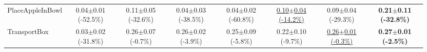\begin{table}[htbp]
\begin{adjustbox}{max width=\textwidth}
\begin{tabular}{l*{7}{c}}
PlaceAppleInBowl & 0.04$\pm$0.01 \scriptsize{(-52.5\%)} & 0.11$\pm$0.05 \scriptsize{(-32.6\%)} & 0.04$\pm$0.03 \scriptsize{(-38.5\%)} & 0.04$\pm$0.02 \scriptsize{(-60.8\%)} & \underline{0.10$\pm$0.04 \scriptsize{(-14.2\%)}} & 0.09$\pm$0.04 \scriptsize{(-29.3\%)} & \textbf{0.21$\pm$0.11 \scriptsize{(-32.8\%)}} \\
TransportBox & 0.03$\pm$0.02 \scriptsize{(-31.8\%)} & 0.26$\pm$0.07 \scriptsize{(-0.7\%)} & 0.26$\pm$0.02 \scriptsize{(-3.9\%)} & 0.25$\pm$0.09 \scriptsize{(-5.8\%)} & 0.22$\pm$0.10 \scriptsize{(-9.7\%)} & \underline{0.26$\pm$0.01 \scriptsize{(-0.3\%)}} & \textbf{0.27$\pm$0.01 \scriptsize{(-2.5\%)}} \\
\bottomrule
\end{tabular}
\end{adjustbox}
\end{table}

